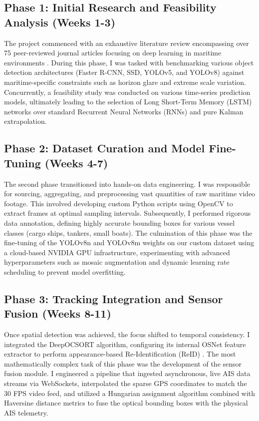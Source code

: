 \subsection{Phase 1: Initial Research and Feasibility Analysis (Weeks 1-3)}
The project commenced with an exhaustive literature review encompassing over 75 peer-reviewed journal articles focusing on deep learning in maritime environments \citep{Ref02}. During this phase, I was tasked with benchmarking various object detection architectures (Faster R-CNN, SSD, YOLOv5, and YOLOv8) against maritime-specific constraints such as horizon glare and extreme scale variation. Concurrently, a feasibility study was conducted on various time-series prediction models, ultimately leading to the selection of Long Short-Term Memory (LSTM) networks over standard Recurrent Neural Networks (RNNs) and pure Kalman extrapolation.

\subsection{Phase 2: Dataset Curation and Model Fine-Tuning (Weeks 4-7)}
The second phase transitioned into hands-on data engineering. I was responsible for sourcing, aggregating, and preprocessing vast quantities of raw maritime video footage. This involved developing custom Python scripts using OpenCV to extract frames at optimal sampling intervals. Subsequently, I performed rigorous data annotation, defining highly accurate bounding boxes for various vessel classes (cargo ships, tankers, small boats). The culmination of this phase was the fine-tuning of the YOLOv8n and YOLOv8m weights on our custom dataset using a cloud-based NVIDIA GPU infrastructure, experimenting with advanced hyperparameters such as mosaic augmentation and dynamic learning rate scheduling to prevent model overfitting.

\subsection{Phase 3: Tracking Integration and Sensor Fusion (Weeks 8-11)}
Once spatial detection was achieved, the focus shifted to temporal consistency. I integrated the DeepOCSORT algorithm, configuring its internal OSNet feature extractor to perform appearance-based Re-Identification (ReID) \citep{Ref03}. The most mathematically complex task of this phase was the development of the sensor fusion module. I engineered a pipeline that ingested asynchronous, live AIS data streams via WebSockets, interpolated the sparse GPS coordinates to match the 30 FPS video feed, and utilized a Hungarian assignment algorithm combined with Haversine distance metrics to fuse the optical bounding boxes with the physical AIS telemetry.

